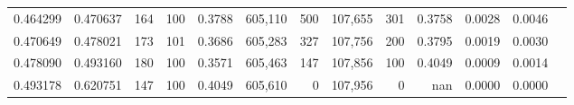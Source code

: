 \begin{tabular}{rrrrrrrrrrrrr}
0.464299 & 0.470637 &   164 & 100 &                                     0.3788 & 605,110 &     500 & 107,655 &     301 & 0.3758 & 0.0028 & 0.0046 \\
0.470649 & 0.478021 &   173 & 101 &                                     0.3686 & 605,283 &     327 & 107,756 &     200 & 0.3795 & 0.0019 & 0.0030 \\
0.478090 & 0.493160 &   180 & 100 &                                     0.3571 & 605,463 &     147 & 107,856 &     100 & 0.4049 & 0.0009 & 0.0014 \\
0.493178 & 0.620751 &   147 & 100 &                                     0.4049 & 605,610 &       0 & 107,956 &       0 &    nan & 0.0000 & 0.0000 \\
\bottomrule
\end{tabular}
